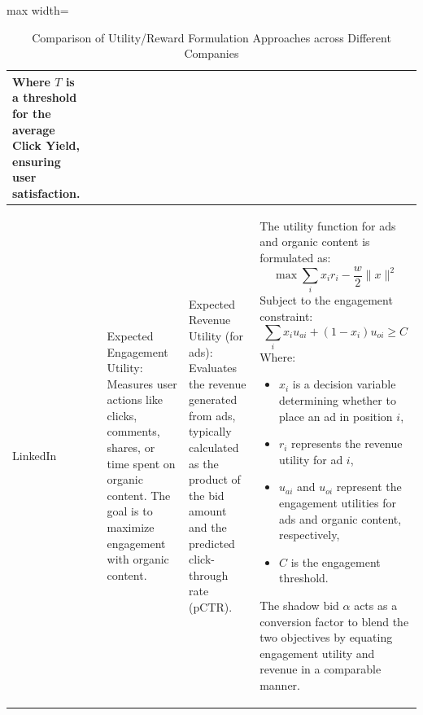 \documentclass[manuscript,review,screen]{acmart}
\begin{document}
\begin{table}[H]
\begin{adjustbox}{max width=\textwidth}
\begin{tabular}{|p{1.5 cm}|p{1 cm}|p{4.5 cm}|p{4.5 cm}|p{4.5 cm}|}
\begin{minipage}{4.5cm}
\[        \]
        Where \(T\) is a threshold for the average Click Yield, ensuring user satisfaction.
        \vspace{4pt}
    \end{minipage} \\
    \hline
    LinkedIn & \cite{yan2020ads} & 
    \begin{minipage}{4.5cm}
    \vspace{4pt}
        Expected Engagement Utility: Measures user actions like clicks, comments, shares, or time spent on organic content. The goal is to maximize engagement with organic content.
        \vspace{4pt}
    \end{minipage}
    & 
    \begin{minipage}{4.5cm}
    \vspace{4pt}
        Expected Revenue Utility (for ads): Evaluates the revenue generated from ads, typically calculated as the product of the bid amount and the predicted click-through rate (pCTR).
        \vspace{4pt}
    \end{minipage}
    & 
    \begin{minipage}{4.5cm}
    \vspace{4pt}
        The utility function for ads and organic content is formulated as:
        \[
        \max \sum_i x_i r_i - \frac{w}{2} \| x \|^2
        \]
        Subject to the engagement constraint:
        \[
        \sum_i x_i u_{ai} + (1 - x_i) u_{oi} \geq C
        \]
        Where:
        \begin{itemize}
            \item \(x_i\) is a decision variable determining whether to place an ad in position \(i\),
            \item \(r_i\) represents the revenue utility for ad \(i\),
            \item \(u_{ai}\) and \(u_{oi}\) represent the engagement utilities for ads and organic content, respectively,
            \item \(C\) is the engagement threshold.
        \end{itemize}
        The shadow bid \(\alpha\) acts as a conversion factor to blend the two objectives by equating engagement utility and revenue in a comparable manner.
        \vspace{4pt}
    \end{minipage} \\
    \hline
\end{tabular}
\end{adjustbox}
\caption{Comparison of Utility/Reward Formulation Approaches across Different Companies}
\label{tab:utility-comparison}
\end{table}
\end{document}
